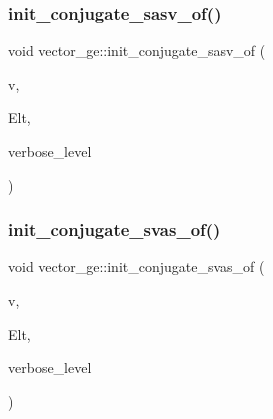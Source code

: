 \mbox{\label{classvector__ge_a2fa34d332539c60df788fd5ad3926103}} 
\subsubsection{\texorpdfstring{init\+\_\+conjugate\+\_\+sasv\+\_\+of()}{init\_conjugate\_sasv\_of()}}
{\footnotesize\ttfamily void vector\+\_\+ge\+::init\+\_\+conjugate\+\_\+sasv\+\_\+of (\begin{DoxyParamCaption}\item[{\mbox{\hyperlink{classvector__ge}{vector\+\_\+ge}} $\ast$}]{v,  }\item[{\mbox{\hyperlink{galois_8h_a09fddde158a3a20bd2dcadb609de11dc}{I\+NT}} $\ast$}]{Elt,  }\item[{\mbox{\hyperlink{galois_8h_a09fddde158a3a20bd2dcadb609de11dc}{I\+NT}}}]{verbose\+\_\+level }\end{DoxyParamCaption})}

\mbox{\label{classvector__ge_a6d93c74b1d2b7f1ae28f9029d8603c3b}} 
\subsubsection{\texorpdfstring{init\+\_\+conjugate\+\_\+svas\+\_\+of()}{init\_conjugate\_svas\_of()}}
{\footnotesize\ttfamily void vector\+\_\+ge\+::init\+\_\+conjugate\+\_\+svas\+\_\+of (\begin{DoxyParamCaption}\item[{\mbox{\hyperlink{classvector__ge}{vector\+\_\+ge}} $\ast$}]{v,  }\item[{\mbox{\hyperlink{galois_8h_a09fddde158a3a20bd2dcadb609de11dc}{I\+NT}} $\ast$}]{Elt,  }\item[{\mbox{\hyperlink{galois_8h_a09fddde158a3a20bd2dcadb609de11dc}{I\+NT}}}]{verbose\+\_\+level }\end{DoxyParamCaption})}

\mbox{\label{classvector__ge_ab5e52a40189cc70d0abcf4233a183e6c}} 

